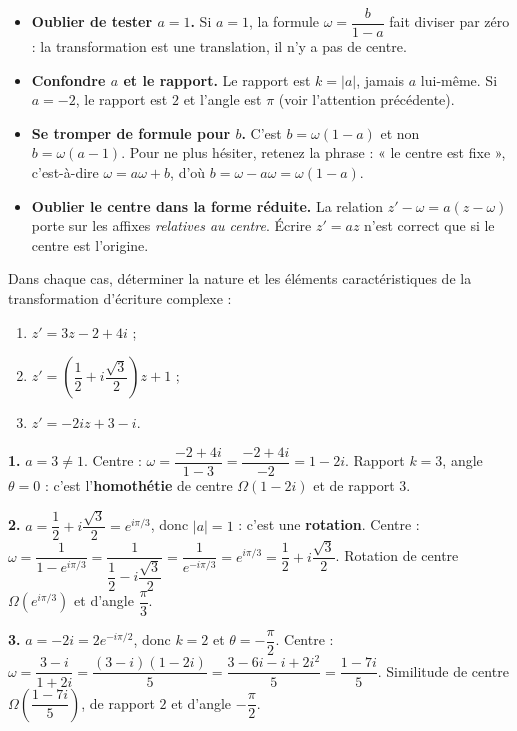 \documentclass[11pt]{article}
\begin{document}
\begin{attention}
\begin{itemize}
\item \textbf{Oublier de tester $a = 1$.} Si $a = 1$, la formule $\omega = \dfrac{b}{1-a}$ fait diviser par zéro : la transformation est une translation, il n'y a pas de centre.
\item \textbf{Confondre $a$ et le rapport.} Le rapport est $k = |a|$, jamais $a$ lui-même. Si $a = -2$, le rapport est $2$ et l'angle est $\pi$ (voir l'attention précédente).
\item \textbf{Se tromper de formule pour $b$.} C'est $b = \omega(1 - a)$ et non $b = \omega(a - 1)$. Pour ne plus hésiter, retenez la phrase : « le centre est fixe », c'est-à-dire $\omega = a\omega + b$, d'où $b = \omega - a\omega = \omega(1 - a)$.
\item \textbf{Oublier le centre dans la forme réduite.} La relation $z' - \omega = a(z - \omega)$ porte sur les affixes \emph{relatives au centre}. Écrire $z' = az$ n'est correct que si le centre est l'origine.
\end{itemize}
\end{attention}

\begin{exercice}
Dans chaque cas, déterminer la nature et les éléments caractéristiques de la transformation d'écriture complexe :
\begin{enumerate}
\item $z' = 3z - 2 + 4i$ ;
\item $z' = \left(\dfrac{1}{2} + i\dfrac{\sqrt{3}}{2}\right)z + 1$ ;
\item $z' = -2iz + 3 - i$.
\end{enumerate}
\end{exercice}

\begin{corrige}
\textbf{1.} $a = 3 \neq 1$. Centre : $\omega = \dfrac{-2 + 4i}{1 - 3} = \dfrac{-2 + 4i}{-2} = 1 - 2i$. Rapport $k = 3$, angle $\theta = 0$ : c'est l'\textbf{homothétie} de centre $\Omega(1 - 2i)$ et de rapport $3$.

\textbf{2.} $a = \dfrac{1}{2} + i\dfrac{\sqrt{3}}{2} = e^{i\pi/3}$, donc $|a| = 1$ : c'est une \textbf{rotation}. Centre : $\omega = \dfrac{1}{1 - e^{i\pi/3}} = \dfrac{1}{\dfrac{1}{2} - i\dfrac{\sqrt{3}}{2}} = \dfrac{1}{e^{-i\pi/3}} = e^{i\pi/3} = \dfrac{1}{2} + i\dfrac{\sqrt{3}}{2}$. Rotation de centre $\Omega\left(e^{i\pi/3}\right)$ et d'angle $\dfrac{\pi}{3}$.

\textbf{3.} $a = -2i = 2e^{-i\pi/2}$, donc $k = 2$ et $\theta = -\dfrac{\pi}{2}$. Centre : $\omega = \dfrac{3 - i}{1 + 2i} = \dfrac{(3 - i)(1 - 2i)}{5} = \dfrac{3 - 6i - i + 2i^2}{5} = \dfrac{1 - 7i}{5}$. Similitude de centre $\Omega\left(\dfrac{1 - 7i}{5}\right)$, de rapport $2$ et d'angle $-\dfrac{\pi}{2}$.
\end{corrige}
\end{document}
